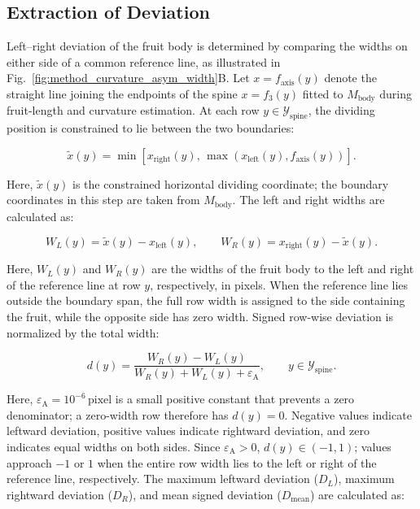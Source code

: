 \documentclass[final,5p,times,twocolumn]{elsarticle}
\begin{document}
\subsection*{Extraction of Deviation}

Left--right deviation of the fruit body is determined by comparing the widths on either side of a common reference line, as illustrated in Fig.~\ref{fig:method_curvature_asym_width}B. Let $x=f_{\mathrm{axis}}(y)$ denote the straight line joining the endpoints of the spine $x=f_3(y)$ fitted to $M_{\mathrm{body}}$ during fruit-length and curvature estimation. At each row $y\in\mathcal{Y}_{\mathrm{spine}}$, the dividing position is constrained to lie between the two boundaries:

\begin{equation}
\tilde{x}(y)=\min\!\left[x_{\mathrm{right}}(y),\,\max\!\left(x_{\mathrm{left}}(y),f_{\mathrm{axis}}(y)\right)\right].
\end{equation}

Here, $\tilde{x}(y)$ is the constrained horizontal dividing coordinate; the boundary coordinates in this step are taken from $M_{\mathrm{body}}$. The left and right widths are calculated as:

\begin{equation}
W_L(y)=\tilde{x}(y)-x_{\mathrm{left}}(y),\qquad W_R(y)=x_{\mathrm{right}}(y)-\tilde{x}(y).
\end{equation}

Here, $W_L(y)$ and $W_R(y)$ are the widths of the fruit body to the left and right of the reference line at row $y$, respectively, in pixels. When the reference line lies outside the boundary span, the full row width is assigned to the side containing the fruit, while the opposite side has zero width. Signed row-wise deviation is normalized by the total width:

\begin{equation}
d(y)=\frac{W_R(y)-W_L(y)}{W_R(y)+W_L(y)+\varepsilon_{\mathrm{A}}},\qquad y\in\mathcal{Y}_{\mathrm{spine}}.
\end{equation}

Here, $\varepsilon_{\mathrm{A}}=10^{-6}\,\mathrm{pixel}$ is a small positive constant that prevents a zero denominator; a zero-width row therefore has $d(y)=0$. Negative values indicate leftward deviation, positive values indicate rightward deviation, and zero indicates equal widths on both sides. Since $\varepsilon_{\mathrm{A}}>0$, $d(y)\in(-1,1)$; values approach $-1$ or $1$ when the entire row width lies to the left or right of the reference line, respectively. The maximum leftward deviation ($D_L$), maximum rightward deviation ($D_R$), and mean signed deviation ($D_{\mathrm{mean}}$) are calculated as:
\end{document}
